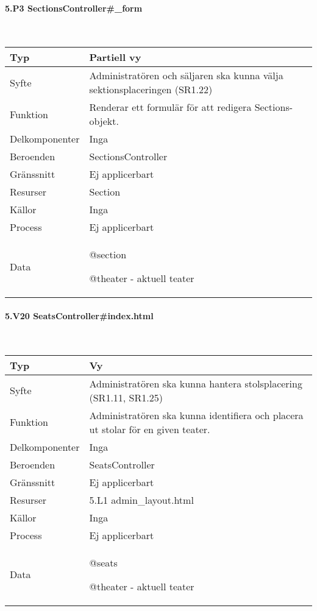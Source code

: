 \documentclass[a4paper, twoside, 11pt, titlepage]{article}
\begin{document}
			\paragraph{5.P3 SectionsController\#\_form}\

			\begin {table} [ht] \begin{tabular} {  p{3.5cm} p{9.6cm} }
				\hline
				{Typ} & {Partiell vy} \\
				\hline
				{Syfte} & {Administratören och säljaren ska kunna välja sektionsplaceringen (SR1.22)} \\
				\hline
				{Funktion} & {Renderar ett formulär för att redigera Sections-objekt.} \\
				\hline
				{Delkomponenter} & {Inga} \\
				\hline
				{Beroenden} & {SectionsController} \\
				\hline
				{Gränssnitt} & {Ej applicerbart} \\
				\hline
				{Resurser} & {Section} \\
				\hline
				{Källor} & {Inga} \\
				\hline
				{Process} & {Ej applicerbart} \\
				\hline
				{Data} & {@section

@theater - aktuell teater} \\
				\hline
			\end{tabular} \end{table} \FloatBarrier


			\paragraph{5.V20 SeatsController\#index.html}\

			\begin {table} [ht] \begin{tabular} {  p{3.5cm} p{9.6cm} }
				\hline
				{Typ} & {Vy} \\
				\hline
				{Syfte} & {Administratören ska kunna hantera stolsplacering (SR1.11, SR1.25)} \\
				\hline
				{Funktion} & {Administratören ska kunna identifiera och placera ut stolar för en given teater.} \\
				\hline
				{Delkomponenter} & {Inga} \\
				\hline
				{Beroenden} & {SeatsController} \\
				\hline
				{Gränssnitt} & {Ej applicerbart} \\
				\hline
				{Resurser} & {5.L1 admin\_layout.html} \\
				\hline
				{Källor} & {Inga} \\
				\hline
				{Process} & {Ej applicerbart} \\
				\hline
				{Data} & {@seats

@theater - aktuell teater} \\
				\hline
			\end{tabular} \end{table} \FloatBarrier
\end{document}
